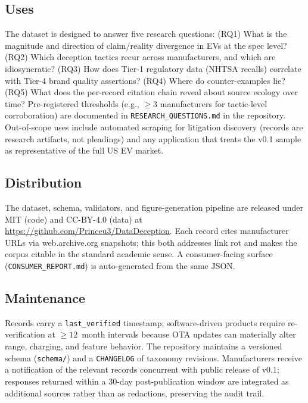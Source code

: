 \documentclass{article}
\begin{document}
\subsection{Uses}\label{sec:uses}

The dataset is designed to answer five research questions: (RQ1) What is the magnitude and direction of claim/reality divergence in EVs at the spec level? (RQ2) Which deception tactics recur across manufacturers, and which are idiosyncratic? (RQ3) How does Tier-1 regulatory data (NHTSA recalls) correlate with Tier-4 brand quality assertions? (RQ4) Where do counter-examples lie? (RQ5) What does the per-record citation chain reveal about source ecology over time? Pre-registered thresholds (e.g., $\geq 3$ manufacturers for tactic-level corroboration) are documented in \texttt{RESEARCH\_QUESTIONS.md} in the repository. Out-of-scope uses include automated scraping for litigation discovery (records are research artifacts, not pleadings) and any application that treats the v0.1 sample as representative of the full US EV market.

\subsection{Distribution}\label{sec:distribution}

The dataset, schema, validators, and figure-generation pipeline are released under MIT (code) and CC-BY-4.0 (data) at \url{https://github.com/Princeu3/DataDeception}. Each record cites manufacturer URLs via web.archive.org snapshots; this both addresses link rot and makes the corpus citable in the standard academic sense. A consumer-facing surface (\texttt{CONSUMER\_REPORT.md}) is auto-generated from the same JSON.

\subsection{Maintenance}\label{sec:maintenance}

Records carry a \texttt{last\_verified} timestamp; software-driven products require re-verification at $\geq 12$~month intervals because OTA updates can materially alter range, charging, and feature behavior. The repository maintains a versioned schema (\texttt{schema/}) and a \texttt{CHANGELOG} of taxonomy revisions. Manufacturers receive a notification of the relevant records concurrent with public release of v0.1; responses returned within a 30-day post-publication window are integrated as additional sources rather than as redactions, preserving the audit trail.
\end{document}

